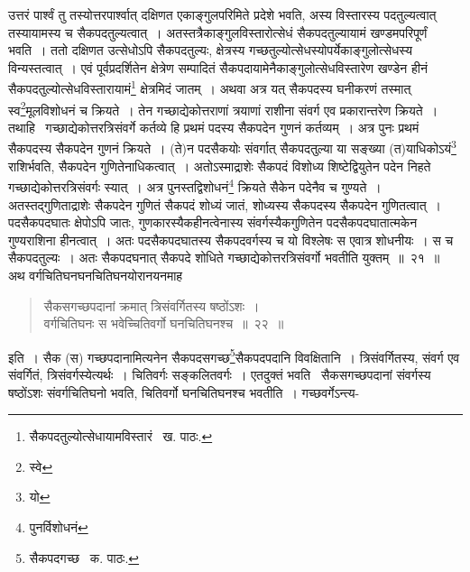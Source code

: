 \documentclass[11pt, openany]{book}
\begin{document}
\noindent उत्तरं पार्श्वं तु तस्योत्तरपार्श्वात् दक्षिणत एकाङ्गुलपरिमिते प्रदेशे भवति, अस्य विस्तारस्य पदतुल्यत्वात् तस्यायामस्य च सैकपदतुल्यत्वात्~। अतस्तत्रैकाङ्गुलविस्तारोत्सेधं सैकपदतुल्यायामं खण्डमपरिपूर्णं भवति~। ततो दक्षिणत उत्सेधोऽपि सैकपदतुल्यः, क्षेत्रस्य गच्छतुल्योत्सेधस्योपर्येकाङ्गुलोत्सेधस्य विन्यस्तत्वात्~। एवं पूर्वप्रदर्शितेन क्षेत्रेण सम्पादितं सैकपदायामेनैकाङ्गुलोत्सेधविस्तारेण खण्डेन हीनं सैकपदतुल्योत्सेधविस्तारायामं\renewcommand{\thefootnote}{१}\footnote{सैकपदतुल्योत्सेधायामविस्तारं \textendash\ ख. पाठः.} क्षेत्रमिदं जातम्~। अथवा अत्र यत् सैकपदस्य घनीकरणं तस्मात् स्व\renewcommand{\thefootnote}{२}\footnote{स्वे}मूलविशोधनं च क्रियते~। तेन गच्छाद्येकोत्तराणां त्रयाणां राशीना संवर्ग एव प्रकारान्तरेण क्रियते~। तथाहि \textendash\ गच्छाद्येकोत्तरत्रिसंवर्गे कर्तव्ये हि प्रथमं पदस्य सैकपदेन गुणनं कर्तव्यम्~। अत्र पुनः प्रथमं सैकपदस्य सैकपदेन गुणनं क्रियते~। (ते)न पदसैकयोः संवर्गात् सैकपदतुल्या या सङ्ख्या (त)याधिकोऽयं\renewcommand{\thefootnote}{३}\footnote{यो} राशिर्भवति, सैकपदेन गुणितेनाधिकत्वात्~। अतोऽस्माद्राशेः सैकपदं विशोध्य शिष्टेद्वियुतेन पदेन निहते गच्छाद्येकोत्तरत्रिसंवर्गः स्यात्~। अत्र पुनस्तद्विशोधनं\renewcommand{\thefootnote}{४}\footnote{पुनर्विशोधनं} क्रियते सैकेन पदेनैव च गुण्यते~। अतस्तद्गुणिताद्राशेः सैकपदेन गुणितं सैकपदं शोध्यं जातं, शोध्यस्य सैकपदस्य सैकपदेन गुणितत्वात्~। पदसैकपदघातः क्षेपोऽपि जातः, गुणकारस्यैकहीनत्वेनास्य संवर्गस्यैकगुणितेन पदसैकपदघातात्मकेन गुण्यराशिना हीनत्वात्~। अतः पदसैकपदघातस्य सैकपदवर्गस्य च यो विश्लेषः स एवात्र शोधनीयः~। स च सैकपदतुल्यः~। अतः सैकपदघनात् सैकपदे शोधिते गच्छाद्येकोत्तरत्रिसंवर्गो भवतीति युक्तम्~॥~२१~॥\\

अथ वर्गचितिघनघनचितिघनयोरानयनमाह\textendash 

\begin{quote}
{\ab सैकसगच्छपदानां क्रमात् त्रिसंवर्गितस्य षष्ठोंऽशः~।\\
वर्गचितिघनः स भवेच्चितिवर्गो घनचितिघनश्च~॥~२२~॥}
\end{quote}

इति~। सैक (स) गच्छपदानामित्यनेन सैकपदसगच्छ\renewcommand{\thefootnote}{५}\footnote{सैकपदगच्छ \textendash\ क. पाठः.}सैकपदपदानि विवक्षितानि~। त्रिसंवर्गितस्य, संवर्ग एव संवर्गितं, त्रिसंवर्गस्येत्यर्थः~। चितिवर्गः सङ्कलितवर्गः~। एतदुक्तं भवति \textendash\ सैकसगच्छपदानां संवर्गस्य षष्ठोंऽशः संवर्गचितिघनो भवति, चितिवर्गो घनचितिघनश्च भवतीति~। गच्छवर्गेऽन्त्य-

\newpage
\end{document}
